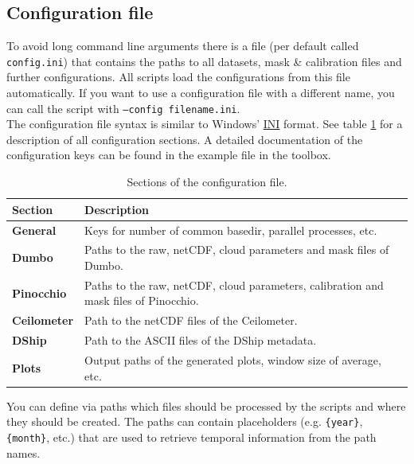 \documentclass[11pt,a4paper]{article}
\begin{document}
\subsection{Configuration file}
To avoid long command line arguments there is a file (per default called \texttt{config.ini}) that contains the paths to all datasets, mask \& calibration files and further configurations. All scripts load the configurations from this file automatically. If you want to use a configuration file with a different name, you can call the script with \texttt{--config filename.ini}.\\

The configuration file syntax is similar to Windows' \href{https://en.wikipedia.org/wiki/INI_file}{INI} format. See table \ref{tab:config-file} for a description of all configuration sections. A detailed documentation of the configuration keys can be found in the example file in the \cloud toolbox.\\

\begin{table}[h!]
	\centering
	\caption{Sections of the configuration file.}
	\label{tab:config-file}
    \begin{tabular}{|l|l|}
    \hline 
    \textbf{Section} & \textbf{Description} \\ 
    \hline \hline 
    \textbf{General} & Keys for number of common basedir, parallel processes, etc. \\ 
    \hline 
    \textbf{Dumbo} & Paths to the raw, netCDF, cloud parameters and mask files of Dumbo. \\ 
    \hline 
    \textbf{Pinocchio} & Paths to the raw, netCDF, cloud parameters, calibration and mask files of Pinocchio. \\ 
    \hline 
    \textbf{Ceilometer} & Path to the netCDF files of the Ceilometer. \\ 
    \hline 
    \textbf{DShip} & Path to the ASCII files of the DShip metadata. \\ 
    \hline 
    \textbf{Plots} & Output paths of the generated plots, window size of average, etc. \\ 
    \hline 
    \end{tabular}
\end{table}

You can define via paths which files should be processed by the scripts and where they should be created. The paths can contain placeholders (e.g. \texttt{\{year\}}, \texttt{\{month\}}, etc.) that are used to retrieve temporal information from the path names.\\
\end{document}
